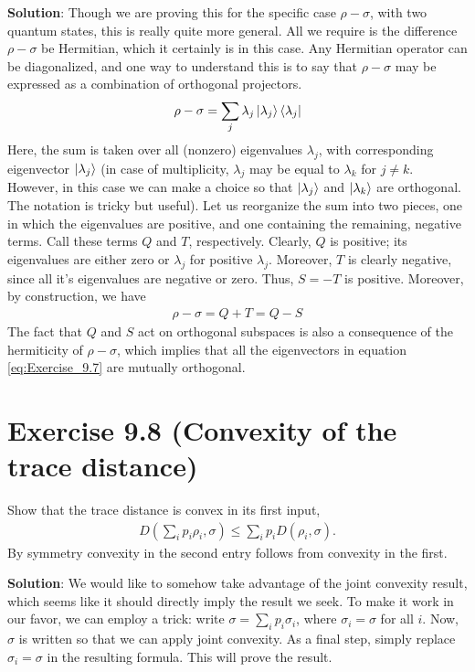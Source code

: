 \documentclass{book}
\begin{document}
    \textbf{Solution}: Though we are proving this for the specific case $\rho -\sigma$, with two quantum states, this is really quite more general. All we require is the difference $\rho - \sigma$ be Hermitian, which it certainly is in this case. Any Hermitian operator can be diagonalized, and one way to understand this is to say that $\rho - \sigma$ may be expressed as a combination of orthogonal projectors.
    \begin{align} \label{eq:Exercise_9.7}
        \rho - \sigma = \sum_j \lambda_j \ket{\lambda_j}\bra{\lambda_j}
    \end{align}
    Here, the sum is taken over all (nonzero) eigenvalues $\lambda_j$, with corresponding eigenvector $\ket{\lambda_j}$ (in case of multiplicity, $\lambda_j$ may be equal to $\lambda_k$ for $j\neq k$. However, in this case we can make a choice so that $\ket{\lambda_j}$ and $\ket{\lambda_k}$ are orthogonal. The notation is tricky but useful). Let us reorganize the sum into two pieces, one in which the eigenvalues are positive, and one containing the remaining, negative terms. Call these terms $Q$ and $T$, respectively. Clearly, $Q$ is positive; its eigenvalues are either zero or $\lambda_j$ for positive $\lambda_j$. Moreover, $T$ is clearly negative, since all it's eigenvalues are negative or zero. Thus, $S = -T$ is positive. Moreover, by construction, we have
    \begin{align}
        \rho - \sigma = Q + T = Q - S
    \end{align}
    The fact that $Q$ and $S$ act on orthogonal subspaces is also a consequence of the hermiticity of $\rho -\sigma$, which implies that all the eigenvectors in equation \eqref{eq:Exercise_9.7} are mutually orthogonal.

\section*{Exercise 9.8 (Convexity of the trace distance)} 
    Show that the trace distance is convex in its first input,
    \begin{align}
        D\left(\sum_i p_i\rho_i, \sigma\right) \leq \sum_i p_i D(\rho_i, \sigma).
    \end{align}
    By symmetry convexity in the second entry follows from convexity in the first.
    
    \textbf{Solution}: We would like to somehow take advantage of the joint convexity result, which seems like it should directly imply the result we seek. To make it work in our favor, we can employ a trick: write $\sigma = \sum_i p_i \sigma_i$, where $\sigma_i = \sigma$ for all $i$. Now, $\sigma$ is written so that we can apply joint convexity. As a final step, simply replace $\sigma_i = \sigma$ in the resulting formula. This will prove the result. 
    
\end{document}
